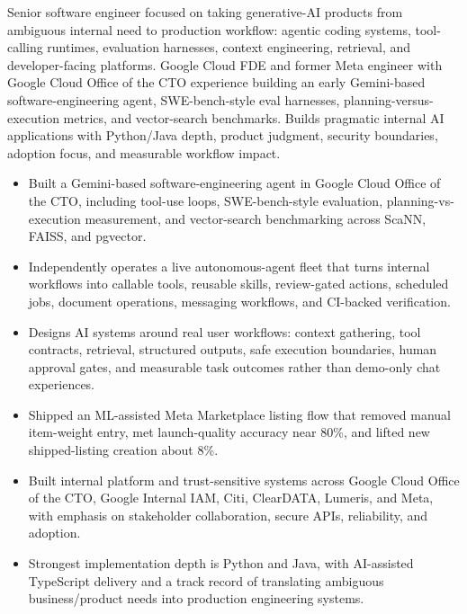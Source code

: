 


Senior software engineer focused on taking generative-AI products from ambiguous internal need to production workflow: agentic coding systems, tool-calling runtimes, evaluation harnesses, context engineering, retrieval, and developer-facing platforms. Google Cloud FDE and former Meta engineer with Google Cloud Office of the CTO experience building an early Gemini-based software-engineering agent, SWE-bench-style eval harnesses, planning-versus-execution metrics, and vector-search benchmarks. Builds pragmatic internal AI applications with Python/Java depth, product judgment, security boundaries, adoption focus, and measurable workflow impact.
\begin{itemize}
  \item Built a Gemini-based software-engineering agent in Google Cloud Office of the CTO, including tool-use loops, SWE-bench-style evaluation, planning-vs-execution measurement, and vector-search benchmarking across ScaNN, FAISS, and pgvector.
  \item Independently operates a live autonomous-agent fleet that turns internal workflows into callable tools, reusable skills, review-gated actions, scheduled jobs, document operations, messaging workflows, and CI-backed verification.
  \item Designs AI systems around real user workflows: context gathering, tool contracts, retrieval, structured outputs, safe execution boundaries, human approval gates, and measurable task outcomes rather than demo-only chat experiences.
\end{itemize}
\begin{itemize}
  \item Shipped an ML-assisted Meta Marketplace listing flow that removed manual item-weight entry, met launch-quality accuracy near 80\%, and lifted new shipped-listing creation about 8\%.
  \item Built internal platform and trust-sensitive systems across Google Cloud Office of the CTO, Google Internal IAM, Citi, ClearDATA, Lumeris, and Meta, with emphasis on stakeholder collaboration, secure APIs, reliability, and adoption.
  \item Strongest implementation depth is Python and Java, with AI-assisted TypeScript delivery and a track record of translating ambiguous business/product needs into production engineering systems.
\end{itemize}




